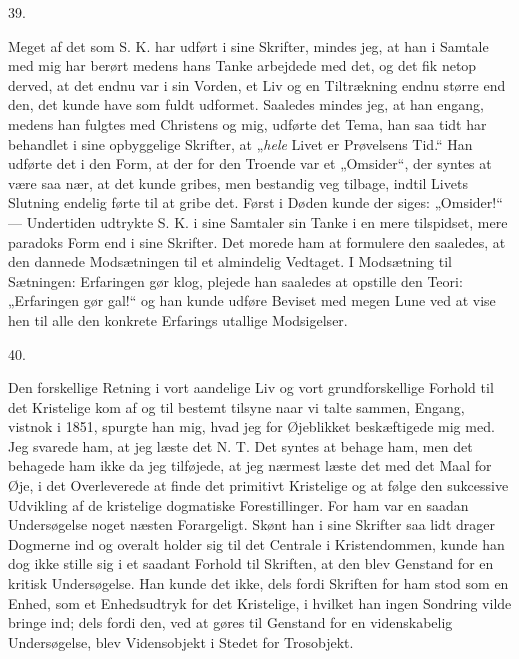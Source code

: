 \documentclass[12pt,a4paper,openany]{book}
\newcommand{\secnum}[1]{\par\begin{center}#1\end{center}\par\nobreak}
\newcommand{\opage}[1]{\marginnote{\footnotesize\textit{[#1]}}}
\begin{document}
\secnum{39.}

Meget af det som S. K. har udført i sine Skrifter,
mindes jeg, at han i Samtale med mig har berørt medens
hans Tanke arbejdede med det, og det fik netop derved,
at det endnu var i sin Vorden, et Liv og en Tiltrækning
endnu større end den, det kunde have som fuldt udformet.
Saaledes mindes jeg, at han engang, medens han fulgtes
\opage{365}med Christens og mig, udførte det Tema, han saa tidt
har behandlet i sine opbyggelige Skrifter, at „\emph{hele} Livet
er Prøvelsens Tid.“ Han udførte det i den Form, at
der for den Troende var et „Omsider“, der syntes at
være saa nær, at det kunde gribes, men bestandig veg
tilbage, indtil Livets Slutning endelig førte til at gribe
det. Først i Døden kunde der siges: „Omsider!“ —
Undertiden udtrykte S. K. i sine Samtaler sin Tanke i
en mere tilspidset, mere paradoks Form end i sine Skrifter.
Det morede ham at formulere den saaledes, at den dannede
Modsætningen til et almindelig Vedtaget. I Modsætning
til Sætningen: Erfaringen gør klog, plejede han saaledes
at opstille den Teori: „Erfaringen gør gal!“ og han
kunde udføre Beviset med megen Lune ved at vise hen
til alle den konkrete Erfarings utallige Modsigelser.

\secnum{40.}

Den forskellige Retning i vort aandelige Liv og vort
grundforskellige Forhold til det Kristelige kom af og til
bestemt tilsyne naar vi talte sammen, Engang, vistnok
i 1851, spurgte han mig, hvad jeg for Øjeblikket beskæftigede
mig med. Jeg svarede ham, at jeg læste det
N. T. Det syntes at behage ham, men det behagede
ham ikke da jeg tilføjede, at jeg nærmest læste det med
det Maal for Øje, i det Overleverede at finde det primitivt
Kristelige og at følge den sukcessive Udvikling af de
kristelige dogmatiske Forestillinger. For ham var en
saadan Undersøgelse noget næsten Forargeligt. Skønt
han i sine Skrifter saa lidt drager Dogmerne ind og overalt
holder sig til det Centrale i Kristendommen, kunde
han dog ikke stille sig i et saadant Forhold til Skriften,
at den blev Genstand for en kritisk Undersøgelse. Han
kunde det ikke, dels fordi Skriften for ham stod som en
Enhed, som et Enhedsudtryk for det Kristelige, i hvilket
han ingen Sondring vilde bringe ind; dels fordi den, ved
\opage{366}at gøres til Genstand for en videnskabelig Undersøgelse,
blev Vidensobjekt i Stedet for Trosobjekt.
\end{document}

